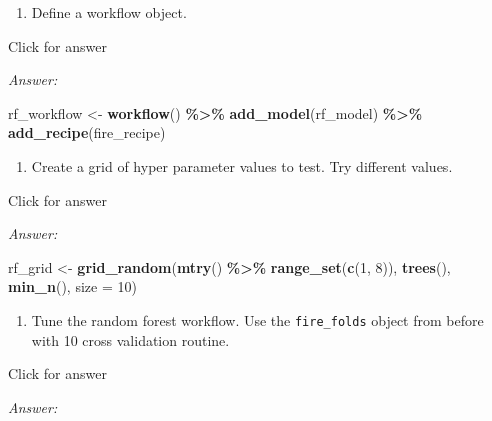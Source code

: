 \documentclass[
]{book}
\newenvironment{Shaded}{\begin{snugshade}}{\end{snugshade}}
\newcommand{\AttributeTok}[1]{\textcolor[rgb]{0.13,0.29,0.53}{#1}}
\newcommand{\DecValTok}[1]{\textcolor[rgb]{0.00,0.00,0.81}{#1}}
\newcommand{\FunctionTok}[1]{\textcolor[rgb]{0.13,0.29,0.53}{\textbf{#1}}}
\newcommand{\NormalTok}[1]{#1}
\newcommand{\OtherTok}[1]{\textcolor[rgb]{0.56,0.35,0.01}{#1}}
\newcommand{\SpecialCharTok}[1]{\textcolor[rgb]{0.81,0.36,0.00}{\textbf{#1}}}
\providecommand{\tightlist}{%
  \setlength{\itemsep}{0pt}\setlength{\parskip}{0pt}}
\begin{document}
\begin{enumerate}
\def\labelenumi{\alph{enumi}.}
\setcounter{enumi}{1}
\tightlist
\item
  Define a workflow object.
\end{enumerate}

Click for answer

\emph{Answer:}

\begin{Shaded}
\begin{Highlighting}[]
\NormalTok{rf\_workflow }\OtherTok{\textless{}{-}} \FunctionTok{workflow}\NormalTok{() }\SpecialCharTok{\%\textgreater{}\%} 
               \FunctionTok{add\_model}\NormalTok{(rf\_model) }\SpecialCharTok{\%\textgreater{}\%} 
               \FunctionTok{add\_recipe}\NormalTok{(fire\_recipe)}
\end{Highlighting}
\end{Shaded}

\begin{enumerate}
\def\labelenumi{\alph{enumi}.}
\setcounter{enumi}{2}
\tightlist
\item
  Create a grid of hyper parameter values to test. Try different values.
\end{enumerate}

Click for answer

\emph{Answer:}

\begin{Shaded}
\begin{Highlighting}[]
\NormalTok{rf\_grid }\OtherTok{\textless{}{-}} \FunctionTok{grid\_random}\NormalTok{(}\FunctionTok{mtry}\NormalTok{() }\SpecialCharTok{\%\textgreater{}\%} \FunctionTok{range\_set}\NormalTok{(}\FunctionTok{c}\NormalTok{(}\DecValTok{1}\NormalTok{, }\DecValTok{8}\NormalTok{)),}
                       \FunctionTok{trees}\NormalTok{(),}
                       \FunctionTok{min\_n}\NormalTok{(),}
                       \AttributeTok{size =} \DecValTok{10}\NormalTok{)}
\end{Highlighting}
\end{Shaded}

\begin{enumerate}
\def\labelenumi{\alph{enumi}.}
\setcounter{enumi}{3}
\tightlist
\item
  Tune the random forest workflow. Use the \texttt{fire\_folds} object from before with 10 cross validation routine.
\end{enumerate}

Click for answer

\emph{Answer:}
\end{document}
